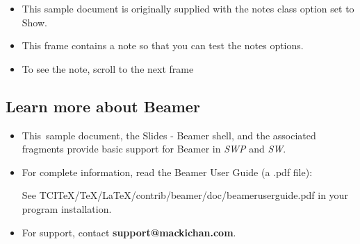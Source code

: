 \documentclass[notes=show,beamer]{beamer}
\begin{document}
\begin{frame}%




\begin{itemize}
\item This sample document is originally supplied with the notes class
option set to Show.

\item This frame contains a note so that you can test the notes options.

\item To see the note, scroll to the next frame
\end{itemize}

\transboxout%
\end{frame}%

\subsection{Learn more about Beamer}

\begin{frame}%


\begin{itemize}
\item This\ sample document, the Slides - Beamer shell, and the associated
fragments provide basic support for Beamer in \textsl{SWP }and \textsl{SW}.

\item For complete information, read the Beamer User Guide (a .pdf file):

See TCITeX/TeX/LaTeX/contrib/beamer/doc/beameruserguide.pdf in your program
installation.

\item For support, contact \textbf{support@mackichan.com}.
\end{itemize}

\transboxout%
\end{frame}%
\end{document}
